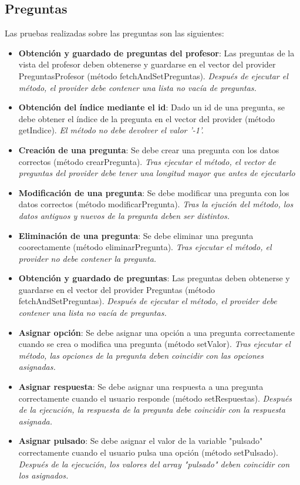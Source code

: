 \subsection{Preguntas}
\label{subsec:pruebas-unidad-preguntas}
Las pruebas realizadas sobre las preguntas son las siguientes:
\begin{itemize}
    \item \textbf{Obtención y guardado de preguntas del profesor}: Las preguntas de la vista del profesor deben obtenerse y guardarse en el vector del provider PreguntasProfesor (método fetchAndSetPreguntas). \textit{Después de ejecutar el método, el provider debe contener una lista no vacía de preguntas.}
    \item \textbf{Obtención del índice mediante el id}: Dado un id de una pregunta, se debe obtener el índice de la pregunta en el vector del provider (método getIndice). \textit{El método no debe devolver el valor '-1'.}
    \item \textbf{Creación de una pregunta}: Se debe crear una pregunta con los datos correctos (método crearPregunta). \textit{Tras ejecutar el método, el vector de preguntas del provider debe tener una longitud mayor que antes de ejecutarlo }
    \item \textbf{Modificación de una pregunta}: Se debe modificar una pregunta con los datos correctos (método modificarPregunta). \textit{Tras la ejución del método, los datos antiguos y nuevos de la pregunta deben ser distintos.}
    \item \textbf{Eliminación de una pregunta}: Se debe eliminar una pregunta coorectamente (método eliminarPregunta). \textit{Tras ejecutar el método, el provider no debe contener la pregunta.}
    \item \textbf{Obtención y guardado de preguntas}: Las preguntas deben obtenerse y guardarse en el vector del provider Preguntas (método fetchAndSetPreguntas). \textit{Después de ejecutar el método, el provider debe contener una lista no vacía de preguntas.}
    \item \textbf{Asignar opción}: Se debe asignar una opción a una pregunta correctamente cuando se crea o modifica una pregunta (método setValor). \textit{Tras ejecutar el método, las opciones de la pregunta deben coincidir con las opciones asignadas.}
    \item \textbf{Asignar respuesta}: Se debe asignar una respuesta a una pregunta correctamente cuando el usuario responde (método setRespuestas). \textit{Después de la ejecución, la respuesta de la pregunta debe coincidir con la respuesta asignada.}
    \item \textbf{Asignar pulsado}: Se debe asignar el valor de la variable "pulsado" correctamente cuando el usuario pulsa una opción (método setPulsado). \textit{Después de la ejecución, los valores del array "pulsado" deben coincidir con los asignados.}
\end{itemize}

